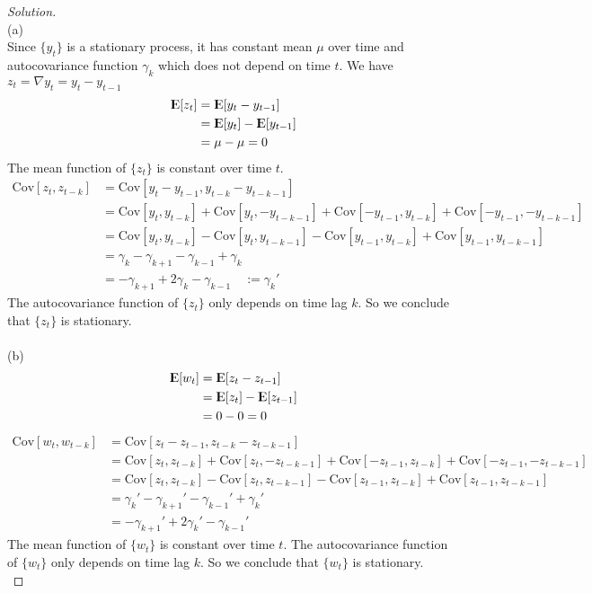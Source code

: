 \documentclass[UTF8,a4paper,14pt]{ctexart}
\newcommand{\E}{{\rm I\kern-.3em E}}
\newcommand{\Cov}{\mathrm{Cov}}
\newenvironment{solution}
  {\renewcommand\qedsymbol{$\blacksquare$}\begin{proof}[Solution]}
  {\end{proof}}
\theoremstyle{definition}
\theoremstyle{remark}
\begin{document}
\begin{solution}\,\\
    (a)\\
    Since $\{y_t\}$ is a stationary process, it has constant mean $\mu$ over time and autocovariance function $\gamma_k$ which does not depend on time $t$. We have $z_t = \nabla y_t =
y_t - y_{t-1}$
\begin{align*}
    \E[z_t] &= \E[y_t - y_{t-1}]\\
     &= \E[y_t] - \E[y_{t-1}]\\ 
     &= \mu - \mu = 0
\end{align*}
The mean function of $\{z_t\}$ is constant over time $t$. 
\begin{align*}
    \Cov[z_t, z_{t-k}] &= \Cov[y_t - y_{t-1}, y_{t-k }- y_{t-k-1}]\\
    &= \Cov[y_t, y_{t-k}] + \Cov[y_t, -y_{t-k-1}] + \Cov[-y_{t-1}, y_{t-k}] + \Cov[-y_{t-1}, -y_{t-k-1}]\\
    &= \Cov[y_t, y_{t-k}] - \Cov[y_t, y_{t-k-1}] - \Cov[y_{t-1}, y_{t-k}] + \Cov[y_{t-1}, y_{t-k-1}]\\
    &= \gamma_k - \gamma_{k+1} - \gamma_{k-1} + \gamma_k\\    
    &= -\gamma_{k+1} + 2\gamma_k - \gamma_{k-1}\quad := \gamma_k' 
\end{align*}
The autocovariance function of $\{z_t\}$ only depends on time lag $k$. So we conclude that $\{z_t\}$ is stationary.\\
\\
(b)
\begin{align*}
    \E[w_t] &= \E[z_t - z_{t-1}]\\
     &= \E[z_t] - \E[z_{t-1}]\\ 
     &= 0 - 0 = 0
\end{align*}
\begin{align*}
    \Cov[w_t, w_{t-k}] &= \Cov[z_t - z_{t-1}, z_{t-k }- z_{t-k-1}]\\
    &= \Cov[z_t, z_{t-k}] + \Cov[z_t, -z_{t-k-1}] + \Cov[-z_{t-1}, z_{t-k}] + \Cov[-z_{t-1}, -z_{t-k-1}]\\
    &= \Cov[z_t, z_{t-k}] - \Cov[z_t, z_{t-k-1}] - \Cov[z_{t-1}, z_{t-k}] + \Cov[z_{t-1}, z_{t-k-1}]\\
    &= \gamma_k' - \gamma_{k+1}' - \gamma_{k-1}' + \gamma_k'\\    
    &= -\gamma_{k+1}' + 2\gamma_k' - \gamma_{k-1}' 
\end{align*}
The mean function of $\{w_t\}$ is constant over time $t$. The autocovariance function of $\{w_t\}$ only depends on time lag $k$. So we conclude that $\{w_t\}$ is stationary.\\
\end{solution}
\end{document}
